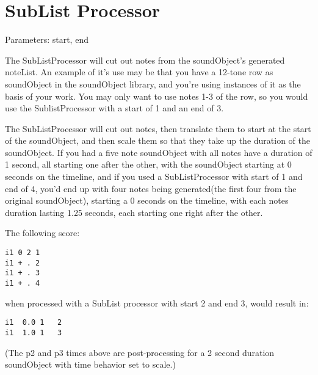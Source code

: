 \section{SubList Processor}\label{sublistProcessor}

Parameters: start, end

The SubListProcessor will cut out notes from the soundObject's generated
noteList. An example of it's use may be that you have a 12-tone row as
soundObject in the soundObject library, and you're using instances of it
as the basis of your work. You may only want to use notes 1-3 of the
row, so you would use the SublistProcessor with a start of 1 and an end
of 3.

The SubListProcessor will cut out notes, then translate them to start at
the start of the soundObject, and then scale them so that they take up
the duration of the soundObject. If you had a five note soundObject with
all notes have a duration of 1 second, all starting one after the other,
with the soundObject starting at 0 seconds on the timeline, and if you
used a SubListProcessor with start of 1 and end of 4, you'd end up with
four notes being generated(the first four from the original
soundObject), starting a 0 seconds on the timeline, with each notes
duration lasting 1.25 seconds, each starting one right after the other.

The following score:

\begin{verbatim}
i1 0 2 1
i1 + . 2
i1 + . 3
i1 + . 4
\end{verbatim}

when processed with a SubList processor with start 2 and end 3, would
result in:

\begin{verbatim}
i1  0.0 1   2
i1  1.0 1   3
\end{verbatim}

(The p2 and p3 times above are post-processing for a 2 second duration
soundObject with time behavior set to scale.)
